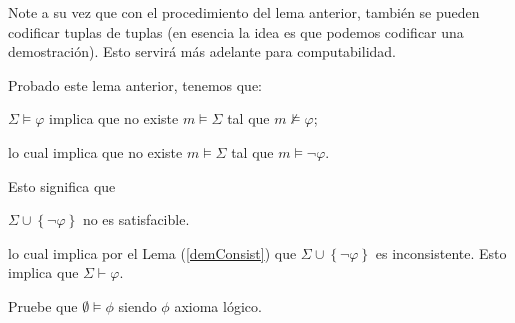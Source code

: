 \documentclass[12pt]{report}
\theoremstyle{largebreak}
\begin{document}
    \begin{obs}
        Note a su vez que con el procedimiento del lema anterior, también se pueden codificar tuplas de tuplas (en esencia la idea es que podemos codificar una demostración). Esto servirá más adelante para computabilidad.
    \end{obs}

    \begin{obs}
        Probado este lema anterior, tenemos que:
        \begin{center}
            $\Sigma\vDash\varphi$ implica que no existe $m\vDash\Sigma$ tal que $m\nvDash\varphi$;

            lo cual implica que no existe $m\vDash\Sigma$ tal que $m\vDash\neg\varphi$.
        \end{center}
        Esto significa que
        \begin{center}
            $\Sigma\cup\left\{\neg\varphi \right\}$ no es satisfacible.
        \end{center}
        lo cual implica por el Lema (\ref{demConsist}) que $\Sigma\cup\left\{\neg\varphi\right\}$ es inconsistente. Esto implica que $\Sigma\vdash\varphi$.
    \end{obs}

    \begin{excer}
        Pruebe que $\emptyset\vDash\phi$ siendo $\phi$ axioma lógico.
    \end{excer}
\end{document}
